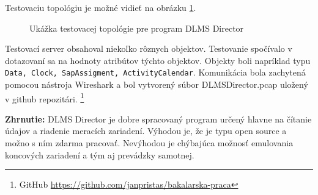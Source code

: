 Testovaciu topológiu je možné vidieť na obrázku \ref{dlmstopology}.
\begin{figure}[h]
    \centering
    \caption{Ukážka testovacej topológie pre program DLMS Director}
\label{dlmstopology}
\end{figure}
Testovací server obsahoval niekoľko rôznych objektov. Testovanie spočívalo v dotazovaní sa na hodnoty atribútov týchto objektov. Objekty boli napríklad typu {\tt Data, Clock, SapAssigment, ActivityCalendar}. Komunikácia bola zachytená pomocou nástroja Wireshark a bol vytvorený súbor DLMSDirector.pcap uložený v github repozitári. \footnote{GitHub \url{https://github.com/janpristas/bakalarska-praca}} \par
\noindent \textbf{Zhrnutie:} DLMS Director je dobre spracovaný program určený hlavne na čítanie údajov a riadenie meracích zariadení. Výhodou je, že je typu open source a možno s ním zdarma pracovať. Nevýhodou je chýbajúca možnosť emulovania koncových zariadení a tým aj prevádzky samotnej.

